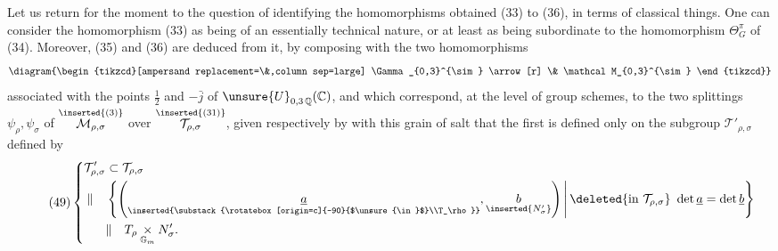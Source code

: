 Let us return for the moment to the question of identifying the  homomorphisms obtained (33) to (36), in terms of classical things. One can consider the homomorphism (33)  as being of an essentially technical nature, or at least as being subordinate to the homomorphism $\Theta_G^\pi$ of (34). Moreover, (35) and (36) are deduced from it, by composing  with the two homomorphisms
\[
\diagram{\begin{tikzcd}[ampersand replacement=\&,column sep=large]
\Gamma_{0,3}^{\sim} \arrow[r] \& \mathcal M_{0,3}^{\sim}
\end{tikzcd}}
\]
 associated with the  points $\frac12$ and $-\bar j$ of $\unsure{U}_{0,3\,\mathbb Q}(\mathbb C)$, and which correspond, at the level of group schemes, to the two splittings $\psi_\rho,\psi_\sigma$ of $\overset{\inserted{(3)}}{\mathcal M_{\rho,\sigma}}$ over $\overset{\inserted{(31)}}{\mathcal T_{\rho,\sigma}}$, given  respectively by
with this grain of salt that the first is defined only on the subgroup $\mathcal T'_{\rho,\sigma}$ defined by
\[
\tag{49}
\left\{\begin{aligned}
\mathcal T'_{\rho,\sigma}&\subset\mathcal T_{\rho,\sigma}\\
\Vert\quad&\left\{\left(\underset{\inserted{\substack{\rotatebox[origin=c]{-90}{$\unsure{\in}$}\\T_\rho}}}{\underline a},\underset{\inserted{N'_\sigma}}{b}\right)\,\middle|\,\deleted{\text{in }\mathcal T_{\rho,\sigma}}\ \det\underline a=\det\underline b\right\}\\
&\Vert\quad T_\rho\mathbin{\underset{\mathbb{G}_m}{\times}}N'_\sigma.
\end{aligned}\right.
\]

